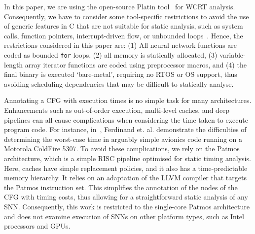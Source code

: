 In this paper, we are using the open-source Platin
tool~\cite{compiler:platin:kps15} for \ac{WCRT}
analysis. Consequently, we have to consider some tool-specific
restrictions to avoid the use of generic features in C that are not
suitable for static analysis, such as system calls, function pointers, interrupt-driven flow, or unbounded loops~\cite{RTOSWCET}.
Hence, the restrictions considered in this paper are: (1) All neural
network functions are coded as bounded \texttt{for} loops, (2) all
memory is statically allocated, (3) variable-length array iterator
functions are coded using preprocessor macros, and (4) the final binary is executed `bare-metal', requiring no
RTOS or OS support, thus avoiding scheduling dependencies
that may be difficult to statically analyse.

Annotating a \ac{CFG} with execution times is no simple task for many architectures.
Enhancements such as out-of-order execution, multi-level caches, and deep pipelines can all cause complications when considering the time taken to execute program code.
For instance, in~\cite{AirplaneWcet}, Ferdinand et. al. demonstrate the difficulties of determining the worst-case time in arguably simple avionics code running on a Motorola ColdFire 5307.
To avoid these complications, we rely on the Patmos~\cite{patmos:ppes2011} architecture, which is a simple RISC pipeline optimised for static timing analysis. 
Here, caches have simple replacement policies, and it also has a time-predictable memory hierarchy.
It relies on an adaptation of the LLVM compiler that targets the Patmos instruction set.
This simplifies the annotation of the nodes of the \ac{CFG} with
timing costs, thus allowing for a straightforward static analysis of any
\ac{SNN}. Consequently, this work is restricted to the single-core
Patmos architecture and does not examine execution of \acp{SNN} on
other platform types, such as Intel processors and GPUs.

